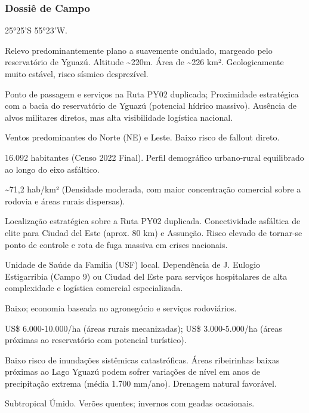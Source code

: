 \subsubsection{Dossiê de Campo}
\begin{description}[style=nextline,leftmargin=0.5cm,font=\bfseries]
\item[Coordenadas]  25°25'S 55°23'W.
\item[Topografia]  Relevo predominantemente plano a suavemente ondulado, margeado pelo reservatório de Yguazú. Altitude \textasciitilde 220m. Área de \textasciitilde 226 km². Geologicamente muito estável, risco sísmico desprezível.
\item[Alvos Estratégicos]  Ponto de passagem e serviços na Ruta PY02 duplicada; Proximidade estratégica com a bacia do reservatório de Yguazú (potencial hídrico massivo). Ausência de alvos militares diretos, mas alta visibilidade logística nacional.
\item[Fallout]  Ventos predominantes do Norte (NE) e Leste. Baixo risco de fallout direto.
\item[População]  16.092 habitantes (Censo 2022 Final). Perfil demográfico urbano-rural equilibrado ao longo do eixo asfáltico.
\item[Densidade]  \textasciitilde 71,2 hab/\allowbreak km² (Densidade moderada, com maior concentração comercial sobre a rodovia e áreas rurais dispersas).
\item[Vias de Acesso]  Localização estratégica sobre a Ruta PY02 duplicada. Conectividade asfáltica de elite para Ciudad del Este (aprox. 80 km) e Assunção. Risco elevado de tornar-se ponto de controle e rota de fuga massiva em crises nacionais.
\item[Serviços]  Unidade de Saúde da Família (USF) local. Dependência de J. Eulogio Estigarribia (Campo 9) ou Ciudad del Este para serviços hospitalares de alta complexidade e logística comercial especializada.
\item[Custo de Vida]  Baixo; economia baseada no agronegócio e serviços rodoviários.
\item[Preço da Terra]  US\$ 6.000-10.000/\allowbreak ha (áreas rurais mecanizadas); US\$ 3.000-5.000/\allowbreak ha (áreas próximas ao reservatório com potencial turístico).
\item[Hidrologia]  Baixo risco de inundações sistêmicas catastróficas. Áreas ribeirinhas baixas próximas ao Lago Yguazú podem sofrer variações de nível em anos de precipitação extrema (média 1.700 mm/\allowbreak ano). Drenagem natural favorável.
\item[Clima]  Subtropical Úmido. Verões quentes; invernos com geadas ocasionais.

\end{description}
